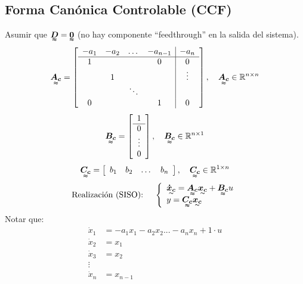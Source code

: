 \subsection{Forma Canónica Controlable (CCF)}
Asumir que $\tenq{D}=\tenq{0}$ (no hay componente ``feedthrough'' en la salida del sistema).
\begin{align*}
\tenq{A_c}=\left[
    \begin{array}{cccc|c}
     -a_1 & -a_2 & \dots & -a_{n-1} & -a_n\\ \hline
     1 & & & 0 & 0\\
       & 1 & & & \vdots\\
       & & \ddots & & \\
     0 & & & 1 & 0  
    \end{array}\right], \quad \tenq{A_c}\in \mathbb{R}^{n\times n}
\end{align*}
\begin{align*}
\tenq{B_c}=\left[
    \begin{array}{c}
     1 \\ \hline
     0\\
    \vdots\\
     0  
    \end{array}\right], \quad \tenq{B_c}\in \mathbb{R}^{n\times 1}
\end{align*}
\begin{align*}
\tenq{C_c}=\left[
    \begin{array}{cccc}
     b_1 & b_2 & \dots & b_n
    \end{array}\right], \quad \tenq{C_c}\in \mathbb{R}^{1\times n}
\end{align*}
\begin{align*}
    \text{Realización (SISO): }\quad 
    \left\{
    \begin{array}{l}
          \tend{\dot{x}_c}=\tenq{A_c}\tend{x_c}+\tenq{B_c}u \\
          y=\tenq{C_c}\tend{x_c} \\
    \end{array} 
    \right. 
\end{align*}
Notar que:
\begin{align*}
    \dot{x}_1 &= -a_1x_1-a_2x_2 ... -a_nx_n+1\cdot u\\
    \dot{x}_2 &= x_1\\
    \dot{x}_3 &= x_2\\
    \vdots \\
    \dot{x}_n &= x_{n-1}
\end{align*}

